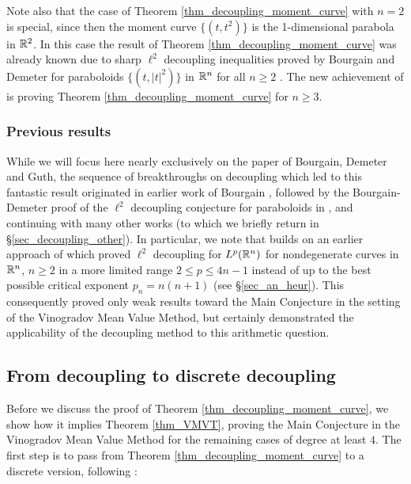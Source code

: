 \documentclass[brochure,english,12pt]{bourbaki}%
\begin{document}
Note also that the case of Theorem \ref{thm_decoupling_moment_curve}  with $n=2$ is special, since then the moment curve $\{ (t,t^2) \}$ is the 1-dimensional parabola in $\mathbb{R}^2$.
In this case the result of Theorem \ref{thm_decoupling_moment_curve} was already known due to sharp $\ell^2$ decoupling inequalities proved by Bourgain and Demeter for paraboloids $\{ (t,|t|^2)\}$ in $\mathbb{R}^n$ for all $n \geq 2$ \cite{BouDem15}.
The new achievement of \cite{BDG16} is proving Theorem \ref{thm_decoupling_moment_curve} for $n \geq 3$. 

\subsubsection{Previous results}
While we will focus here nearly exclusively on the paper \cite{BDG16} of Bourgain, Demeter and Guth, the sequence of breakthroughs on decoupling which led to this fantastic result  originated in earlier work of Bourgain \cite{Bou13}, followed by the Bourgain-Demeter proof of the $\ell^2$ decoupling conjecture for paraboloids in \cite{BouDem15}, and continuing with many other works (to which we briefly return in  \S \ref{sec_decoupling_other}). 
In particular, we note that \cite{BDG16} builds on an earlier approach of \cite[Thm. 1.4]{BouDem14x} which proved $\ell^2$ decoupling for $L^p(\mathbb{R}^n)$ for nondegenerate curves in $\mathbb{R}^n$, $n \geq 2$ in a more limited range $2 \leq p \leq 4n-1$ instead of up to the best possible critical exponent $p_n = n(n+1)$ (see \S \ref{sec_an_heur}). This consequently proved only weak results toward the Main Conjecture in the setting of the Vinogradov Mean Value Method, but certainly demonstrated the applicability of the decoupling method to this arithmetic question. 



\subsection{From decoupling to discrete decoupling}	 
	Before we discuss the proof of Theorem \ref{thm_decoupling_moment_curve}, we show how it implies  Theorem \ref{thm_VMVT}, proving the Main Conjecture in the Vinogradov Mean Value Method for the remaining cases of degree at least $4$.
	The first step is to pass from Theorem  \ref{thm_decoupling_moment_curve} to  a discrete version, following \cite[Thm. 4.1]{BDG16}:
	
\end{document}

